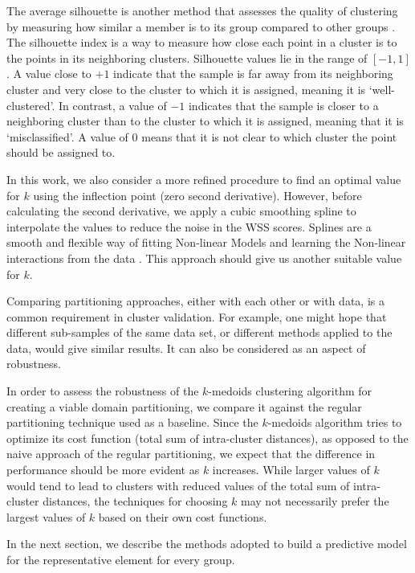 The average silhouette is another method that assesses the quality of clustering by measuring how similar a member is to its group compared to other groups \cite{Rousseeuw1987}. The silhouette index is a way to measure how close each point in a cluster is to the points in its neighboring clusters.  Silhouette values lie in the range of $[-1, 1]$. A value close to $+1$ indicate that the sample is far away from its neighboring cluster and very close to the cluster to which it is assigned, meaning it is `well-clustered'. In contrast, a value of $-1$ indicates that the sample is closer to a neighboring cluster than to the cluster to which it is assigned, meaning that it is `misclassified'. A value of $0$ means that it is not clear to which cluster the point should be assigned to. 

In this work, we also consider a more refined procedure to find an optimal value for $k$ using the inflection point (zero second derivative). However, before calculating the second derivative, we apply a cubic smoothing spline to interpolate the values to reduce the noise in the WSS scores. Splines are a smooth and flexible way of fitting Non-linear Models and learning the Non-linear interactions from the data \cite{HastieTF2009}. This approach should give us another suitable value for $k$.

Comparing partitioning approaches, either with each other or with data, is a common requirement in cluster validation. For example, one might hope that different sub-samples of the same data set, or different methods applied to the data, would give similar results. It can also be considered as an aspect of robustness.

In order to assess the robustness of the $k$-medoids clustering algorithm for creating a viable domain partitioning, we compare it against the regular partitioning technique used as a baseline. Since the $k$-medoids algorithm tries to optimize its cost function (total sum of intra-cluster distances), as opposed to the naive approach of the regular partitioning, we expect that the difference in performance should be more evident as $k$ increases. While larger values of $k$ would tend to lead to clusters with reduced values of the total sum of intra-cluster distances, the techniques for choosing $k$ may not necessarily prefer the largest values of $k$ based on their own cost functions.

In the next section, we describe the methods adopted to build a predictive model for the representative element for every group.

